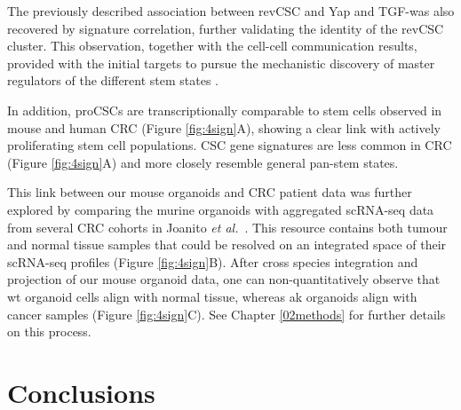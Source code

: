 The previously described association between revCSC and Yap and TGF-\textbeta\hspace{0.1cm}was also recovered by signature correlation, further validating the identity of the revCSC cluster. This observation, together with the cell-cell communication results, provided with the initial targets to pursue the mechanistic discovery of master regulators of the different stem states \cite{cardoso_rodriguez_single-cell_2023}.

In addition, proCSCs are transcriptionally comparable to stem cells observed in mouse and human CRC (Figure \ref{fig:4sign}A), showing a clear link with actively proliferating stem cell populations. CSC gene signatures are less common in CRC (Figure \ref{fig:4sign}A) and more closely resemble general pan-stem states.

This link between our mouse organoids and CRC patient data was further explored by comparing the murine organoids with aggregated scRNA-seq data from several CRC cohorts in Joanito \emph{et al.}~\cite{joanito_single-cell_2022}. This resource contains both tumour and normal tissue samples that could be resolved on an integrated space of their scRNA-seq profiles (Figure \ref{fig:4sign}B). After cross species integration and projection of our mouse organoid data, one can non-quantitatively observe that \acrshort{wt} organoid cells align with normal tissue, whereas \acrshort{ak} organoids align with cancer samples (Figure \ref{fig:4sign}C). See Chapter \ref{02methods} for further details on this process.

\newpage
\section{Conclusions}


